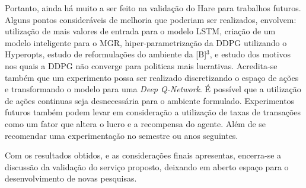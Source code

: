 Portanto, ainda há muito a ser feito na validação do Hare para trabalhos futuros. Alguns pontos consideráveis de melhoria que poderiam ser realizados, envolvem: utilização de mais valores de entrada para o modelo \acrshort{LSTM}, criação de um modelo inteligente para o \acrshort{MGR}, hiper-parametrização da \acrshort{DDPG} utilizando o Hyperopts, estudo de reformulações do ambiente da [B]$^3$, e estudo dos motivos nos quais a \acrshort{DDPG} não converge para politicas mais lucrativas. Acredita-se também que um experimento possa ser realizado discretizando o espaço de ações e transformando o modelo para uma \emph{Deep Q-Network}. É possível que a utilização de ações continuas seja desnecessária para o ambiente formulado. Experimentos futuros também podem levar em consideração a utilização de taxas de transações como um fator que altera o lucro e a recompensa do agente. Além de se recomendar uma experimentação no semestre ou anos seguintes.

Com os resultados obtidos, e as considerações finais apresentas, encerra-se a discussão da validação do serviço proposto, deixando em aberto espaço para o desenvolvimento de novas pesquisas.